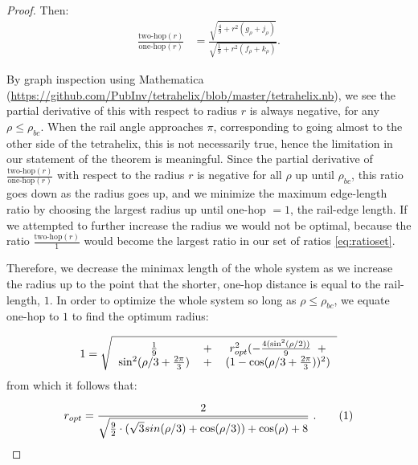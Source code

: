 \documentclass[twocolumn,10pt]{asme2ej}
\newcommand\numberthis{\addtocounter{equation}{1}\tag{\theequation}}
\begin{document}
\begin{proof}
Then:
\begin{equation}
  \begin{split}
  \frac{\text{two-hop}(r)}{ \text{one-hop}(r)}  &=
  \frac{\sqrt{\frac{4}{9}  + r^2(g_{\rho}+ j_{\rho})}}
       {\sqrt{\frac{1}{9} +r^2(f_{\rho}+k_{\rho}) }} \text{.}
  \end{split}       
\end{equation}



By graph inspection using Mathematica (\url{https://github.com/PubInv/tetrahelix/blob/master/tetrahelix.nb}), we see the partial derivative of this with respect to
radius $r$ is always negative, for any $\rho \leq \rho_{bc}$. When the rail angle approaches
$\pi$, corresponding to going almost to the other side of the tetrahelix, this is not necessarily true, hence the
limitation in our statement of the theorem is meaningful.
Since the partial derivative of  $\frac{\text{two-hop}(r)}{\text{one-hop}(r)}$ with respect to the
radius $r$ is negative for all $\rho$ up until $\rho_{bc}$, this ratio goes down
as the radius goes up, and 
we minimize the maximum edge-length ratio by choosing the largest radius
up until one-hop $= 1$, the rail-edge length. If we attempted to further increase the radius
we would not be optimal, because the ratio $\frac{\text{two-hop}(r)}{1}$ would become the
largest ratio in our set of ratios \cref{eq:ratioset}.

Therefore, we decrease the minimax length
of the whole system as we increase the radius
up to the point that the shorter, one-hop distance is equal to the rail-length, $1$.
In order to optimize the whole system so long as $\rho \leq \rho_{bc}$,
we equate one-hop to $1$ to find the optimum radius:


\begin{equation}
  1 =  \sqrt{
    \begin{tabular}{ccc}
    $  \frac{1}{9} $ & + & $ r_{opt}^2(-\frac{4 (\sin^2( \rho / 2))}{9} \; \;+ $\\
$      \sin^2(\rho/3+ \frac{2\pi}{3}) $ & + & $ (1 - \cos(\rho/3 + \frac{2\pi}{3}))^2) $
    \end{tabular}
    }
\end{equation}    
from which it follows that:

\begin{equation}
  r_{opt} = \frac{2}{\sqrt{\frac{9}{2} \cdot ( \sqrt{3} sin(\rho/3) + \cos(\rho/3)) + \cos(\rho)+ 8 }} \text{ .} \numberthis  \label{eqrhoopt}
\end{equation}



\end{proof}
\end{document}
